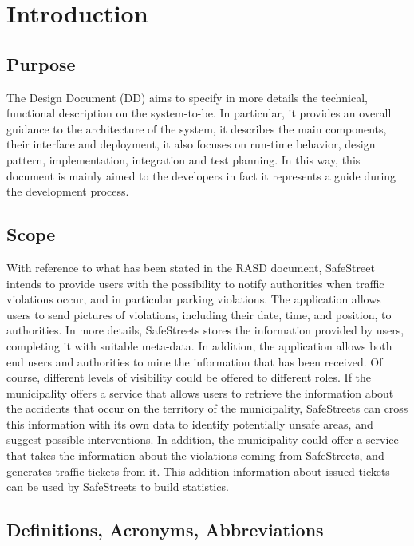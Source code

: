 \documentclass[../RASD.tex]{subfiles}
\begin{document}
    \chapter{Introduction}\label{ch:introduction}
    \section{Purpose}\label{sec:purpose}
    The Design Document (DD) aims to specify in more details the technical, functional description on the system-to-be.
    In particular, it provides an overall guidance to the architecture of the system, it describes the main components,
    their interface and deployment, it also focuses on run-time behavior, design pattern, implementation, integration and test planning.
    In this way, this document is mainly aimed to the developers in fact it represents a guide during the development process.
    \newpage
    \section{Scope}\label{sec:scope}
    With reference to what has been stated in the RASD document, SafeStreet intends to provide users with the possibility
    to notify authorities when traffic violations occur, and in particular parking violations.
    The application allows users to send pictures of violations, including their date, time, and position, to authorities.
    In more details, SafeStreets stores the information provided by users, completing it with suitable meta-data.
    In addition, the application allows both end users and authorities to mine the information that has been received.
    Of course, different levels of visibility could be offered to different roles.
    If the municipality offers a service that allows users to retrieve the information about the accidents that occur on the territory of the municipality,
    SafeStreets can cross this information with its own data to identify potentially unsafe areas, and suggest possible interventions.
    In addition, the municipality could offer a service that takes the information about the violations coming from SafeStreets, and generates traffic tickets from it.
    This addition information about issued tickets can be used by SafeStreets to build statistics.
    \newpage
    \section{Definitions, Acronyms, Abbreviations}\label{sec:definitions,-acronyms,-abbreviations}
\end{document}
